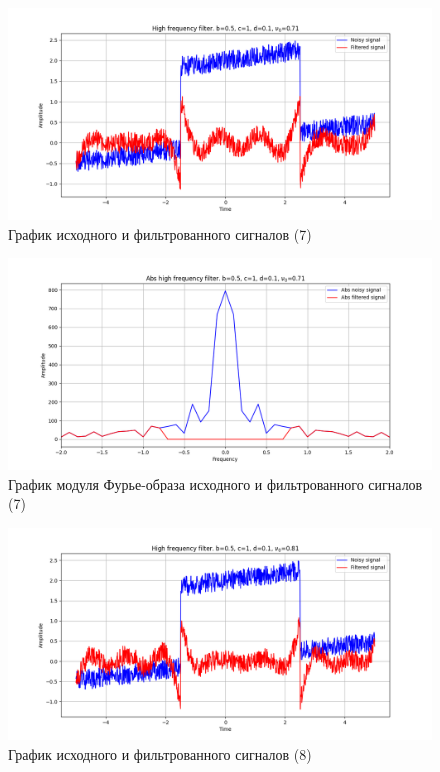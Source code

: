 \documentclass[a4paper, 12pt]{article}
\begin{document}
    \begin{figure}[!htb]
        \centering
        \includegraphics[scale=0.48]{7_u_flt_u_nolow.png}
        \captionsetup{skip=0pt}
        \caption{График исходного и фильтрованного сигналов (7)}
        \label{fig:fig39}
    \end{figure}
    \begin{figure}[!htb]
        \centering
        \includegraphics[scale=0.48]{7_abs_u_U_nolow.png}
        \captionsetup{skip=0pt}
        \caption{График модуля Фурье-образа исходного и фильтрованного сигналов (7)}
        \label{fig:fig40}
    \end{figure}
    \newpage
    \begin{figure}[!htb]
        \centering
        \includegraphics[scale=0.48]{8_u_flt_u_nolow.png}
        \captionsetup{skip=0pt}
        \caption{График исходного и фильтрованного сигналов (8)}
        \label{fig:fig41}
    \end{figure}
\end{document}
